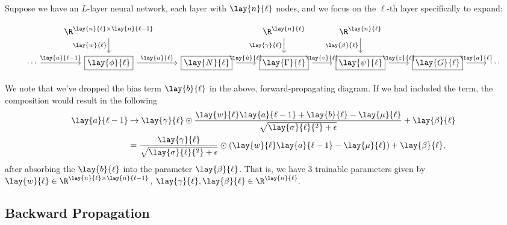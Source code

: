 Suppose we have an $L$-layer neural network, each layer with $\lay{n}{\ell}$ nodes, and we focus on the $\ell$-th layer specifically to expand:

{\tiny
\begin{equation*}
	\begin{tikzcd}
		{}
		&\R^{\lay{n}{\ell}\times\lay{n}{\ell-1}}
		\arrow[d, swap, "\lay{w}{\ell}"]
		&{}
		&\R^{\lay{n}{\ell}}
		\arrow[d, swap, "\lay{\gamma}{\ell}"]
		&\R^{\lay{n}{\ell}}
		\arrow[d, swap, "\lay{\beta}{\ell}"]
		&{}
		\\
		\cdots
		\arrow[r, "\lay{a}{\ell-1}"]
		&\boxed{\lay{\phi}{\ell}}
		\arrow[r, "\lay{u}{\ell}"]
		&\boxed{\lay{N}{\ell}}
		\arrow[r, "\lay{\hat{u}}{\ell}"]
		&\boxed{\lay{\Gamma}{\ell}}
		\arrow[r, "\lay{v}{\ell}"]
		&\boxed{\lay{\psi}{\ell}}
		\arrow[r, "\lay{z}{\ell}"]
		&\boxed{\lay{G}{\ell}}
		\arrow[r, "\lay{a}{\ell}"]
		&\cdots
	\end{tikzcd}
\end{equation*}
}

We note that we've dropped the bias term $\lay{b}{\ell}$ in the above, forward-propagating diagram.  If we had included the term, the composition would result in the following
\begin{align*}
	\lay{a}{\ell-1}&\mapsto\lay{\gamma}{\ell}\odot\frac{\lay{w}{\ell}\lay{a}{\ell-1}+\lay{b}{\ell}-\lay{\mu}{\ell}}{\sqrt{\lay{\sigma}{\ell}{^2}+\epsilon}}+\lay{\beta}{\ell}\\
	&=\frac{\lay{\gamma}{\ell}}{\sqrt{\lay{\sigma}{\ell}{^2}+\epsilon}}\odot(\lay{w}{\ell}\lay{a}{\ell-1}-\lay{\mu}{\ell})+\lay{\beta}{\ell},
\end{align*}
after absorbing the $\lay{b}{\ell}$ into the parameter $\lay{\beta}{\ell}$.  That is, we have $3$ trainable parameters given by $\lay{w}{\ell}\in\R^{\lay{n}{\ell}\times \lay{n}{\ell-1}}$, $\lay{\gamma}{\ell},\lay{\beta}{\ell}\in\R^{\lay{n}{\ell}}.$




\subsection{Backward Propagation}

